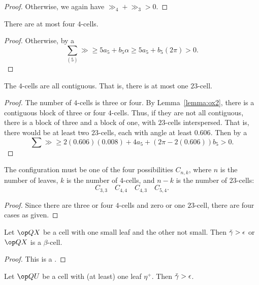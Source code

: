 \begin{proof}
Otherwise, we again have $\gg_4+\gg_3>0$.
\end{proof}

\begin{lemma}\label{lemma:ox44} There are at most four $4$-cells.
\end{lemma}

\begin{proof}
  Otherwise, by a 
\[
\sum_{(5)} \gg \ge 5 a_5 + b_5\alpha \ge 5 a_5 +  b_5 (2\pi) > 0.
\]
\end{proof}

\begin{lemma}\label{lemma:oxC} The $4$-cells are all contiguous.  That is, there is at most one $23$-cell.
\end{lemma}

\begin{proof}
The number of $4$-cells is three or four.
By Lemma~\ref{lemma:ox2}, there is a contiguous block of three or four $4$-cells.  Thus,
if they are not all contiguous, there is a block of three and a block of one,
with $23$-cells interspersed.  That is, there would be at least two $23$-cells,
each with angle at least $0.606$.  Then by a 
\[
\sum \gg \ge 2 (0.606) (0.008) + 4 a_5 + (2\pi-2 (0.606)) b_5 > 0.
\]
\end{proof}

\begin{lemma}\label{lemma:ox-cases} The configuration must be one of the four possibilities $C_{n,k}$, where $n$ is the number of leaves, $k$ is the number of $4$-cells, and $n-k$ is the number of $23$-cells:
\[
C_{3,3}\quad C_{4,4}\quad C_{4,3}\quad C_{5,4}.
\]
\end{lemma}

\begin{proof} Since there are three or four $4$-cells and zero or one $23$-cell,
there are four cases as given.
\end{proof}

\begin{lemma} Let $\QX$ be a cell with one small leaf and the other not small.
Then $\check\gamma > \epsilon$ or $\QX$ is a $\beta$-cell.  
\end{lemma}

\begin{proof} This is a .
\end{proof}

\begin{lemma} 
Let $\QU$ be a cell with (at least) one leaf $\eta^+$.  Then $\check\gamma > \epsilon$.
\end{lemma}


